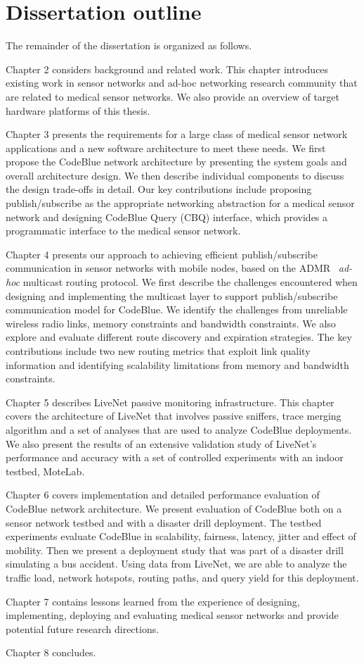 \section{Dissertation outline}

The remainder of the dissertation is organized as follows.

Chapter 2 considers background and related work. This chapter introduces 
existing work in sensor networks and ad-hoc networking research community that 
are related to medical sensor networks. We also provide an overview of target
hardware platforms of this thesis.

Chapter 3 presents the requirements for a large class of medical sensor
network applications and a new software architecture to meet these
needs. We first propose the CodeBlue network architecture by presenting the
system goals and overall architecture design. We then describe individual
components
to discuss the design trade-offs in detail. Our key contributions include
proposing publish/subscribe as the appropriate networking abstraction for
a medical sensor network and designing CodeBlue Query (CBQ) interface, which
provides a programmatic interface to the medical sensor network.

Chapter 4 presents our approach to achieving efficient publish/subscribe
communication in sensor networks with mobile nodes, based on the
ADMR~\cite{admr-mobihoc01} {\em ad-hoc\/} multicast routing
protocol. We first describe the challenges encountered when designing and 
implementing the multicast layer to support publish/subscribe communication 
model for CodeBlue. We identify the
challenges from unreliable wireless radio links, memory constraints and
bandwidth constraints. We also explore and evaluate different route discovery
and expiration strategies. The key contributions include two new 
routing metrics that exploit link quality information and identifying
scalability limitations from memory and bandwidth constraints.

Chapter 5 describes LiveNet passive monitoring infrastructure. This chapter 
covers the architecture of LiveNet that involves passive sniffers, trace
merging algorithm and a set of analyses that are used to analyze CodeBlue
deployments. We also present the results of an extensive validation study of 
LiveNet's performance and accuracy with a set of controlled experiments with 
an indoor testbed, MoteLab.

Chapter 6 covers implementation and detailed performance evaluation of
CodeBlue network architecture.  We present evaluation of CodeBlue both on a
sensor network testbed and with a disaster drill deployment.  The testbed
experiments evaluate CodeBlue in scalability, fairness, latency, jitter and
effect of mobility. Then we present a deployment study that was part of a disaster
drill simulating a bus accident. Using data from LiveNet, we are able to
analyze the traffic load, network hotspots, routing paths, and query yield for
this deployment.

Chapter 7 contains lessons learned from the experience of 
designing, implementing, deploying and evaluating medical sensor networks and
provide potential future research directions. 

Chapter 8 concludes.
